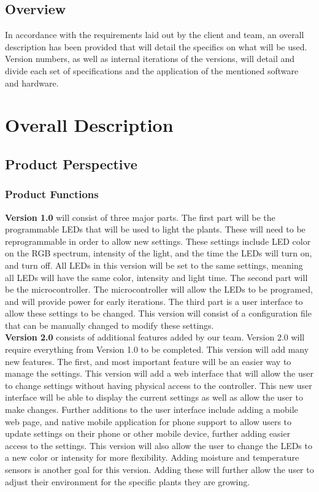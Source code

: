 \documentclass[onecolumn, draftclsnofoot,10pt, compsoc]{IEEEtran}
\begin{document}
		\endgroup

		\subsection{Overview}
			In accordance with the requirements laid out by the client and team, an overall description has been provided that will detail the specifics on what will be used. Version numbers, as well as internal iterations of the versions, will detail
			and divide each set of specifications and the application of the mentioned software and hardware.


	\section{Overall Description}
		\subsection{Product Perspective}

		\subsubsection{Product Functions}
		\noindent \textbf{Version 1.0} will consist of three major parts. The first part will be the programmable LEDs that will be used to light the plants. These will need to be reprogrammable in order to allow new settings.
		These settings include LED color on the RGB spectrum, intensity of the light, and the time the LEDs will turn on, and turn off. All LEDs in this version will be set to the same settings, meaning all
		LEDs will have the same color, intensity and light time. The second part will be the microcontroller. The microcontroller will allow the LEDs to be programed, and will provide power for early iterations.
		The third part is a user interface to allow these settings to be changed. This version will consist of a configuration file that can be manually changed to modify these settings.\\

		\noindent \textbf{Version 2.0} consists of additional features added by our team. Version 2.0 will require everything from Version 1.0 to be completed. This version will add many new features. The first, and most
		important feature will be an easier way to manage the settings. This version will add a web interface that will allow the user to change settings without having physical access to the controller.
		This new user interface will be able to display the current settings as well as allow the user to make changes. Further additions to the user interface include adding a mobile web page, and native mobile application for
		phone support to allow users to update settings on their phone or other mobile device, further adding easier access to the settings. This version will also allow the user to change the LEDs to a new color or intensity for more flexibility. Adding moisture and temperature sensors is another goal for this version. Adding these will further allow the user to adjust
		their environment for the specific plants they are growing.\\
\end{document}
